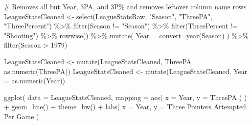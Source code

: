 \documentclass[
  letterpaper,
  DIV=11,
  numbers=noendperiod]{scrartcl}
\newenvironment{Shaded}{\begin{snugshade}}{\end{snugshade}}
\newcommand{\AttributeTok}[1]{\textcolor[rgb]{0.40,0.45,0.13}{#1}}
\newcommand{\CommentTok}[1]{\textcolor[rgb]{0.37,0.37,0.37}{#1}}
\newcommand{\DecValTok}[1]{\textcolor[rgb]{0.68,0.00,0.00}{#1}}
\newcommand{\FunctionTok}[1]{\textcolor[rgb]{0.28,0.35,0.67}{#1}}
\newcommand{\NormalTok}[1]{\textcolor[rgb]{0.00,0.23,0.31}{#1}}
\newcommand{\OtherTok}[1]{\textcolor[rgb]{0.00,0.23,0.31}{#1}}
\newcommand{\SpecialCharTok}[1]{\textcolor[rgb]{0.37,0.37,0.37}{#1}}
\newcommand{\StringTok}[1]{\textcolor[rgb]{0.13,0.47,0.30}{#1}}
\begin{document}
\begin{Shaded}
\begin{Highlighting}[]
\CommentTok{\# Removes all but Year, 3PA, and 3P\% and removes leftover column name rows}
\NormalTok{LeagueStatsCleaned }\OtherTok{\textless{}{-}} \FunctionTok{select}\NormalTok{(LeagueStatsRaw, }\StringTok{"Season"}\NormalTok{, }\StringTok{"ThreePA"}\NormalTok{, }\StringTok{"ThreePercent"}\NormalTok{) }\SpecialCharTok{\%\textgreater{}\%}
  \FunctionTok{filter}\NormalTok{(Season }\SpecialCharTok{!=} \StringTok{"Season"}\NormalTok{) }\SpecialCharTok{\%\textgreater{}\%}
  \FunctionTok{filter}\NormalTok{(ThreePercent }\SpecialCharTok{!=} \StringTok{"Shooting"}\NormalTok{) }\SpecialCharTok{\%\textgreater{}\%}
  \FunctionTok{rowwise}\NormalTok{() }\SpecialCharTok{\%\textgreater{}\%}
  \FunctionTok{mutate}\NormalTok{(}
    \AttributeTok{Year =} \FunctionTok{convert\_year}\NormalTok{(Season)}
\NormalTok{  ) }\SpecialCharTok{\%\textgreater{}\%}
  \FunctionTok{filter}\NormalTok{(Season }\SpecialCharTok{\textgreater{}} \DecValTok{1979}\NormalTok{)}

\NormalTok{LeagueStatsCleaned }\OtherTok{\textless{}{-}} \FunctionTok{mutate}\NormalTok{(LeagueStatsCleaned, }\AttributeTok{ThreePA =} \FunctionTok{as.numeric}\NormalTok{(ThreePA))}
\NormalTok{LeagueStatsCleaned }\OtherTok{\textless{}{-}} \FunctionTok{mutate}\NormalTok{(LeagueStatsCleaned, }\AttributeTok{Year =} \FunctionTok{as.numeric}\NormalTok{(Year))}

\FunctionTok{ggplot}\NormalTok{(}
  \AttributeTok{data =}\NormalTok{ LeagueStatsCleaned,}
  \AttributeTok{mapping =} \FunctionTok{aes}\NormalTok{(}
  \AttributeTok{x =}\NormalTok{ Year,}
  \AttributeTok{y =}\NormalTok{ ThreePA}
\NormalTok{  )}
\NormalTok{) }\SpecialCharTok{+} \FunctionTok{geom\_line}\NormalTok{() }\SpecialCharTok{+}
  \FunctionTok{theme\_bw}\NormalTok{() }\SpecialCharTok{+}
  \FunctionTok{labs}\NormalTok{(}
    \AttributeTok{x =} \StringTok{\textquotesingle{}Year\textquotesingle{}}\NormalTok{,}
    \AttributeTok{y =} \StringTok{\textquotesingle{}Three Pointers Attempted Per Game\textquotesingle{}}
\NormalTok{  )}


\end{Highlighting}
\end{Shaded}
\end{document}
